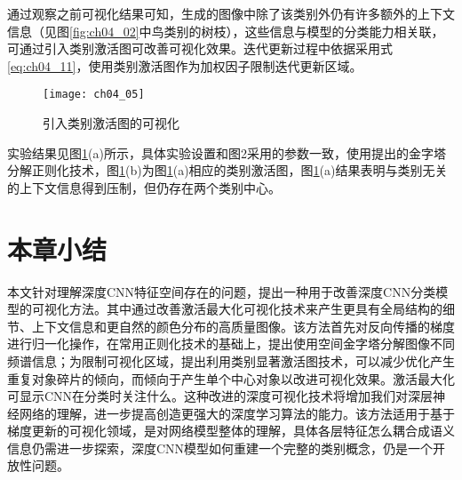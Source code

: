 通过观察之前可视化结果可知，生成的图像中除了该类别外仍有许多额外的上下文信息（见图\ref{fig:ch04_02}中鸟类别的树枝），这些信息与模型的分类能力相关联，可通过引入类别激活图可改善可视化效果。迭代更新过程中依据采用式\ref{eq:ch04_11}，使用类别激活图作为加权因子限制迭代更新区域。
\begin{figure}[!htbp]
\centering
\texttt{[image: ch04\_05]}
\caption{引入类别激活图的可视化}
\label{fig:ch04_05}
\end{figure}  

实验结果见图\ref{fig:ch04_05}(a)所示，具体实验设置和图2采用的参数一致，使用提出的金字塔分解正则化技术，图\ref{fig:ch04_05}(b)为图\ref{fig:ch04_05}(a)相应的类别激活图，图\ref{fig:ch04_05}(a)结果表明与类别无关的上下文信息得到压制，但仍存在两个类别中心。

\section{本章小结}

本文针对理解深度CNN特征空间存在的问题，提出一种用于改善深度CNN分类模型的可视化方法。其中通过改善激活最大化可视化技术来产生更具有全局结构的细节、上下文信息和更自然的颜色分布的高质量图像。该方法首先对反向传播的梯度进行归一化操作，在常用正则化技术的基础上，提出使用空间金字塔分解图像不同频谱信息；为限制可视化区域，提出利用类别显著激活图技术，可以减少优化产生重复对象碎片的倾向，而倾向于产生单个中心对象以改进可视化效果。激活最大化可显示CNN在分类时关注什么。这种改进的深度可视化技术将增加我们对深层神经网络的理解，进一步提高创造更强大的深度学习算法的能力。该方法适用于基于梯度更新的可视化领域，是对网络模型整体的理解，具体各层特征怎么耦合成语义信息仍需进一步探索，深度CNN模型如何重建一个完整的类别概念，仍是一个开放性问题。
